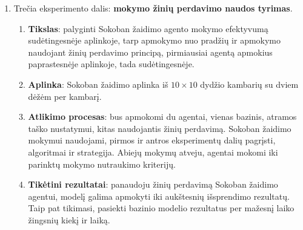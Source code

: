 \documentclass{VUMIFPSbakalaurinis}
\begin{document}
{\begin{enumerate}
\begin{enumerate}
			\item \textbf{Tikėtini rezultatai}: visų algoritmų panašus efektyvumas, tačiau ACER turėtų pasiekti patenkinamus rezultatus per mažesni žingsnių skaičių nei A2C, dėl patirties pakartojimo buferio. Taip pat, A2C laiko atžvilgiu turėtų baigti mokymosi procesą daug greičiau nei kiti algoritmai, dėl paprastesnės architektūros. Galiausiai, PPO2 yra paremtas A2C su pridėtais pagerinimais, tikimasi jog PPO2 mokysis greičiau nei A2C laiko žingsnių atžvilgiu.
		\end{enumerate}		
	
		\item Trečia eksperimento dalis: \textbf{mokymo žinių perdavimo naudos tyrimas}.
		\begin{enumerate}
			\item \textbf{Tikslas}: palyginti Sokoban žaidimo agento mokymo efektyvumą sudėtingesnėje aplinkoje, tarp apmokymo nuo pradžių ir apmokymo naudojant žinių perdavimo principą, pirmiausiai agentą apmokius paprastesnėje aplinkoje, tada sudėtingesnėje.
			
			\item \textbf{Aplinka}: Sokoban žaidimo aplinka iš \(10 \times 10\) dydžio kambarių su dviem dėžėm per kambarį.
			
			\item \textbf{Atlikimo procesas}: bus apmokomi du agentai, vienas bazinis, atramos taško nustatymui, kitas naudojantis žinių perdavimą. Sokoban žaidimo mokymui naudojami, pirmos ir antros eksperimentų dalių pagrįsti, algoritmai ir strategija. Abiejų mokymų atveju, agentai mokomi iki parinktų mokymo nutraukimo kriterijų.
			
			\item \textbf{Tikėtini rezultatai}: panaudoju žinių perdavimą Sokoban žaidimo agentui, modelį galima apmokyti iki aukštesnių išsprendimo rezultatų. Taip pat tikimasi, pasiekti bazinio modelio rezultatus per mažesnį laiko žingsnių kiekį ir laiką.
		\end{enumerate}		
	\end{enumerate}
}
\end{document}
